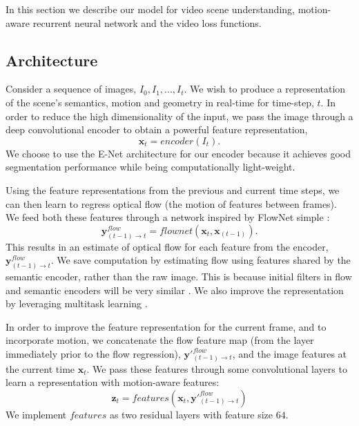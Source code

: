 In this section we describe our model for video scene understanding, motion-aware recurrent neural network and the video loss functions.

\subsection{Architecture}

Consider a sequence of images, $I_0, I_1, ... , I_t$. We wish to produce a representation of the scene's semantics, motion and geometry in real-time for time-step, $t$.
In order to reduce the high dimensionality of the input, we pass the image through a deep convolutional encoder to obtain a powerful feature representation,
\begin{equation}
\mathbf{x}_t = encoder(I_t).
\end{equation}
We choose to use the E-Net architecture for our encoder \cite{paszke2016enet} because it achieves good segmentation performance while being computationally light-weight.

Using the feature representations from the previous and current time steps, we can then learn to regress optical flow (the motion of features between frames). We feed both these features through a network inspired by FlowNet simple \cite{flownet}:
\begin{equation}
\mathbf{y}^{flow}_{(t-1) \to t} = flownet(\mathbf{x}_t, \mathbf{x}_{(t-1)}).
\end{equation}
This results in an estimate of optical flow for each feature from the encoder, $\mathbf{y}^{flow}_{(t-1) \to t} $. We save computation by estimating flow using features shared by the semantic encoder, rather than the raw image. This is because initial filters in flow and semantic encoders will be very similar \cite{zeiler2014visualizing}. We also improve the representation by leveraging multitask learning \cite{caruana1998multitask}.

In order to improve the feature representation for the current frame, and to incorporate motion, we concatenate the flow feature map (from the layer immediately prior to the flow regression), $\mathbf{y}'^{flow}_{(t-1) \to t}$, and the image features at the current time $\mathbf{x}_t$. We pass these features through some convolutional layers to learn a representation with motion-aware features:
\begin{equation}
\mathbf{z}_t = features(\mathbf{x}_t, \mathbf{y}'^{flow}_{(t-1) \to t})
\end{equation}
We implement $features$ as two residual layers \cite{he2016deep} with feature size $64$.

